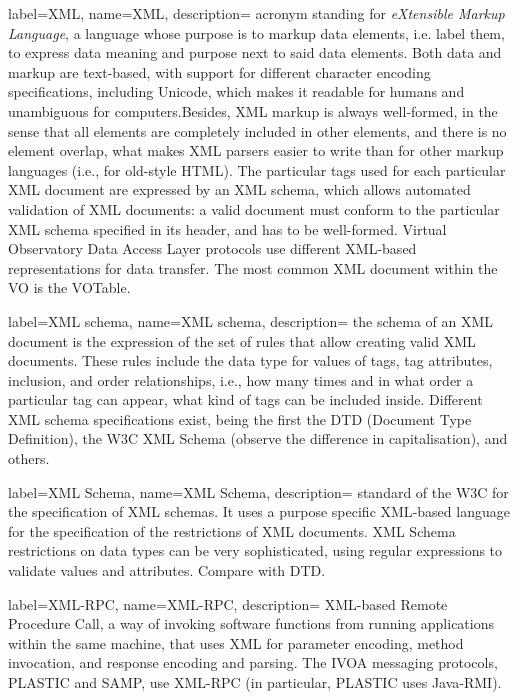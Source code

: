 {
    label={XML},
    name={XML},
    description={
    	acronym standing for \emph{eXtensible Markup Language}, a
        language whose purpose is to \gls{markup} data elements, i.e.
        label them, to express data meaning and purpose next to said
        data elements. Both data and markup are text-based, with
        support for different character encoding specifications,
        including Unicode, which makes it readable for humans and
        unambiguous for computers.Besides, XML markup is always
        well-formed, in the sense that all elements are completely
        included in other elements, and there is no element overlap,
        what makes XML parsers easier to write than for other markup
        languages (i.e., for old-style \gls{HTML}). The particular
        \gls{tags} used for each particular XML document are expressed
        by an \gls{XML schema}, which allows automated validation of
        XML documents: a valid document must conform to the particular
        XML schema specified in its header, and has to be well-formed.
        \gls{Virtual Observatory} \gls{Data Access Layer} protocols use
        different XML-based representations for data transfer. The most
        common XML document within the VO is the \gls{VOTable}.
    }
}

{
    label={XML schema},
    name={XML schema},
    description={
    	the schema of an \gls{XML} document is the expression of the
        set of rules that allow creating valid XML documents. These
        rules include the data type for values of \gls{tags}, tag
        \gls{attributes}, inclusion, and order relationships, i.e., how
        many times and in what order a particular tag can appear, what
        kind of tags can be included inside. Different XML schema
        specifications exist, being the first the \gls{DTD} (Document
        Type Definition), the \gls{W3C} \gls{XML Schema} (observe the
        difference in capitalisation), and others.
    }
}

{
    label={XML Schema},
    name={XML Schema},
    description={
    	standard of the \gls{W3C} for the specification of \gls{XML
        schema}s. It uses a purpose specific \gls{XML}-based language
        for the specification of the restrictions of XML documents. XML
        Schema restrictions on data types can be very sophisticated,
        using \gls{regular expressions} to validate values and
        attributes. Compare with \gls{DTD}.
    }
}

{
    label={XML-RPC},
    name={XML-RPC},
    description={
    	\gls{XML}-based Remote Procedure Call, a way of invoking
        software functions from running applications within the same
        machine, that uses XML for parameter encoding, method
        invocation, and response encoding and parsing. The \gls{IVOA}
        messaging protocols, \gls{PLASTIC} and \gls{SAMP}, use XML-RPC
        (in particular, PLASTIC uses \gls{Java-RMI}).
    }
}
